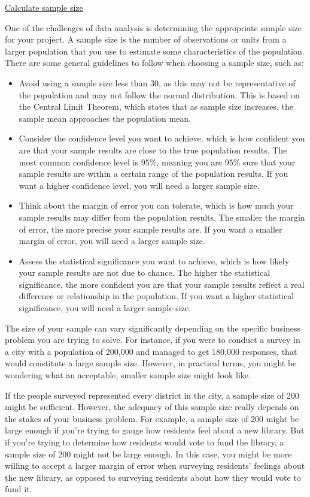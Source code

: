 \documentclass[]{article}
\begin{document}
\uline{Calculate sample size} \par
One of the challenges of data analysis is determining the appropriate sample size for your project. A sample size is the number of observations or units from a larger population that you use to estimate some characteristics of the population. There are some general guidelines to follow when choosing a sample size, such as:
\begin{itemize}
  \item Avoid using a sample size less than 30, as this may not be representative of the population and may not follow the normal distribution. This is based on the Central Limit Theorem, which states that as sample size increases, the sample mean approaches the population mean.
  \item Consider the confidence level you want to achieve, which is how confident you are that your sample results are close to the true population results. The most common confidence level is 95\%, meaning you are 95\% sure that your sample results are within a certain range of the population results. If you want a higher confidence level, you will need a larger sample size.
  \item Think about the margin of error you can tolerate, which is how much your sample results may differ from the population results. The smaller the margin of error, the more precise your sample results are. If you want a smaller margin of error, you will need a larger sample size.
  \item Assess the statistical significance you want to achieve, which is how likely your sample results are not due to chance. The higher the statistical significance, the more confident you are that your sample results reflect a real difference or relationship in the population. If you want a higher statistical significance, you will need a larger sample size.
\end{itemize}

The size of your sample can vary significantly depending on the specific business problem you are trying to solve. For instance, if you were to conduct a survey in a city with a population of 200,000 and managed to get 180,000 responses, that would constitute a large sample size. However, in practical terms, you might be wondering what an acceptable, smaller sample size might look like.

If the people surveyed represented every district in the city, a sample size of 200 might be sufficient. However, the adequacy of this sample size really depends on the stakes of your business problem. For example, a sample size of 200 might be large enough if you're trying to gauge how residents feel about a new library. But if you're trying to determine how residents would vote to fund the library, a sample size of 200 might not be large enough. In this case, you might be more willing to accept a larger margin of error when surveying residents' feelings about the new library, as opposed to surveying residents about how they would vote to fund it.
\end{document}
